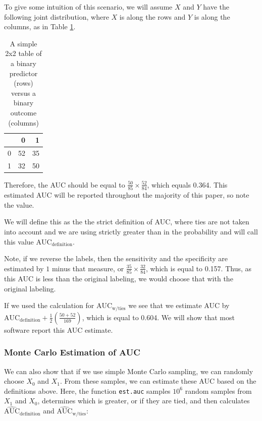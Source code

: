 \documentclass[12pt]{article}
\let\code=\texttt
\newenvironment{CodeChunk}{}{}
\begin{document}
To give some intuition of this scenario, we will assume \(X\) and \(Y\)
have the following joint distribution, where \(X\) is along the rows and
\(Y\) is along the columns, as in Table \ref{tab:create_tab}.

\begin{CodeChunk}
\begin{table}[ht]

\caption{\label{tab:create_tab}A simple 2x2 table of a binary predictor (rows) versus a binary outcome (columns)}
\centering
\begin{tabular}{l|r|r}
\hline
  & 0 & 1\\
\hline
0 & 52 & 35\\
\hline
1 & 32 & 50\\
\hline
\end{tabular}
\end{table}

\end{CodeChunk}

Therefore, the AUC should be equal to
\(\frac{50}{85} \times \frac{52}{84}\), which equals 0.364. This
estimated AUC will be reported throughout the majority of this paper, so
note the value.

We will define this as the the strict definition of AUC, where ties are
not taken into account and we are using strictly greater than in the
probability and will call this value \(\text{AUC}_{\text{definition}}\).

Note, if we reverse the labels, then the sensitivity and the specificity
are estimated by \(1\) minus that measure, or
\(\frac{35}{85} \times \frac{32}{84}\), which is equal to 0.157. Thus,
as this AUC is less than the original labeling, we would choose that
with the original labeling.

If we used the calculation for \(\text{AUC}_{\text{w/ties}}\) we see
that we estimate AUC by
\(\text{AUC}_{\text{definition}} + \frac{1}{2}\left( \frac{50 + 52}{169}\right)\),
which is equal to 0.604. We will show that most software report this AUC
estimate.

\hypertarget{monte-carlo-estimation-of-auc}{%
\subsubsection{Monte Carlo Estimation of
AUC}\label{monte-carlo-estimation-of-auc}}

We can also show that if we use simple Monte Carlo sampling, we can
randomly choose \(X_{0}\) and \(X_{1}\). From these samples, we can
estimate these AUC based on the definitions above. Here, the function
\code{est.auc} samples \(10^{6}\) random samples from \(X_{1}\) and
\(X_{0}\), determines which is greater, or if they are tied, and then
calculates \(\widehat{\text{AUC}}_{\text{definition}}\) and
\(\widehat{\text{AUC}}_{\text{w/ties}}\):
\end{document}
